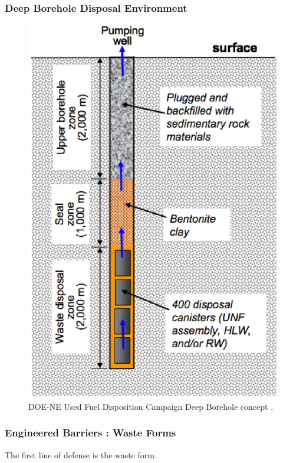 \begin{frame}[ctb!]
  \frametitle{Deep Borehole Disposal Environment}
  \footnotesize{

  \begin{figure}[h!]
    \begin{center}
      \includegraphics[height=.7\textheight]{./images/boreholeGPAM.eps}
    \end{center}
    \caption{DOE-NE Used Fuel Disposition Campaign Deep Borehole concept 
    \cite{hardin_generic_2011}.}
    \label{fig:boreholeGPAM}
  \end{figure}
}
\end{frame}

\begin{frame}[ctb!]
  \frametitle{Engineered Barriers : Waste Forms}
\footnotesize{
  The first line of defense is the waste form.
  
}
\end{frame}

